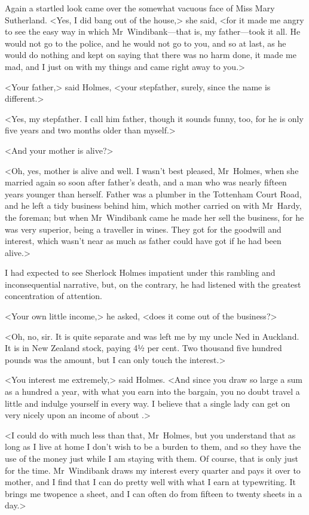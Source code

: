 Again a startled look came over the somewhat vacuous face of Miss Mary Sutherland. <Yes, I did bang out of the house,> she said, <for it made me angry to see the easy way in which Mr~Windibank—that is, my father—took it all. He would not go to the police, and he would not go to you, and so at last, as he would do nothing and kept on saying that there was no harm done, it made me mad, and I just on with my things and came right away to you.>

<Your father,> said Holmes, <your stepfather, surely, since the name is different.>

<Yes, my stepfather. I call him father, though it sounds funny, too, for he is only five years and two months older than myself.>

<And your mother is alive?>

<Oh, yes, mother is alive and well. I wasn't best pleased, Mr~Holmes, when she married again so soon after father's death, and a man who was nearly fifteen years younger than herself. Father was a plumber in the Tottenham Court Road, and he left a tidy business behind him, which mother carried on with Mr~Hardy, the foreman; but when Mr~Windibank came he made her sell the business, for he was very superior, being a traveller in wines. They got  for the goodwill and interest, which wasn't near as much as father could have got if he had been alive.>

I had expected to see Sherlock Holmes impatient under this rambling and inconsequential narrative, but, on the contrary, he had listened with the greatest concentration of attention.

<Your own little income,> he asked, <does it come out of the business?>

<Oh, no, sir. It is quite separate and was left me by my uncle Ned in Auckland. It is in New Zealand stock, paying 4½ per cent. Two thousand five hundred pounds was the amount, but I can only touch the interest.>

<You interest me extremely,> said Holmes. <And since you draw so large a sum as a hundred a year, with what you earn into the bargain, you no doubt travel a little and indulge yourself in every way. I believe that a single lady can get on very nicely upon an income of about .>

<I could do with much less than that, Mr~Holmes, but you understand that as long as I live at home I don't wish to be a burden to them, and so they have the use of the money just while I am staying with them. Of course, that is only just for the time. Mr~Windibank draws my interest every quarter and pays it over to mother, and I find that I can do pretty well with what I earn at typewriting. It brings me twopence a sheet, and I can often do from fifteen to twenty sheets in a day.>

